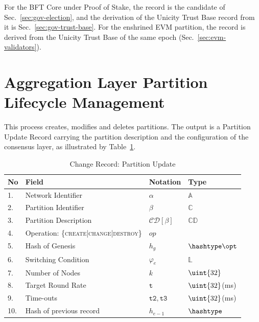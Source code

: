 For the BFT Core under Proof of Stake, the record is the candidate of Sec.~\ref{sec:gov-election}, and the derivation of the Unicity Trust Base record from it is Sec.~\ref{sec:gov-trust-base}. For the enshrined EVM partition, the record is derived from the Unicity Trust Base of the same epoch (Sec.~\ref{sec:evm-validators}).

\section{Aggregation Layer Partition Lifecycle Management}

This process creates, modifies and deletes partitions. The output is a Partition Update Record carrying the partition description and the configuration of the consensus layer, as illustrated by Table~\ref{ta:pcr}.

\begin{table}[!htbp]
	\begin{center}
		\caption{Change Record: Partition Update}\label{ta:pcr}
		\begin{tabular}{|p{0.6cm}|p{8cm}|p{1.7cm}|p{3.5cm}|}\hline
			No & Field                 & Notation & Type \\\hline\hline
			1. & Network Identifier    & $\alpha$ & $\mathbb{A}$       \\\hline
			2. & Partition Identifier  & $\beta$  & $\mathbb{C}$      \\\hline
			3. & Partition Description & $\mathcal{CD}[\beta]$ & $\mathbb{CD}$ \\\hline
			4. & Operation: \{\textsc{create|change|destroy}\} & $op$   &  \\\hline
			5. & Hash of Genesis       & $h_g$    &  $\hashtype\opt$\\\hline
			6. & Switching Condition   & $\varphi_e$ & $\mathbb{L}$   \\\hline
			7. & Number of Nodes       & $k$      & $\uint{32}$       \\\hline
			8. & Target Round Rate     & $\mathtt{t}$ & $\uint{32}$(ms)    \\\hline
			9. & Time-outs             & $\mathtt{t2}, \mathtt{t3}$ & $\uint{32}$(ms)    \\\hline
			10. & Hash of previous record & $h_{e-1}$& $\hashtype$  \\\hline
		\end{tabular}
	\end{center}
\end{table}

